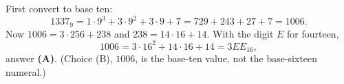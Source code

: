 First convert to base ten:
\[
1337_9=1\cdot9^3+3\cdot9^2+3\cdot9+7=729+243+27+7=1006 .
\]
Now $1006=3\cdot256+238$ and $238=14\cdot16+14$. With the digit $E$ for fourteen,
\[
1006=3\cdot16^2+14\cdot16+14=3EE_{16},
\]
answer \textbf{(A)}. (Choice (B), $1006$, is the base-ten value, not the base-sixteen numeral.)

